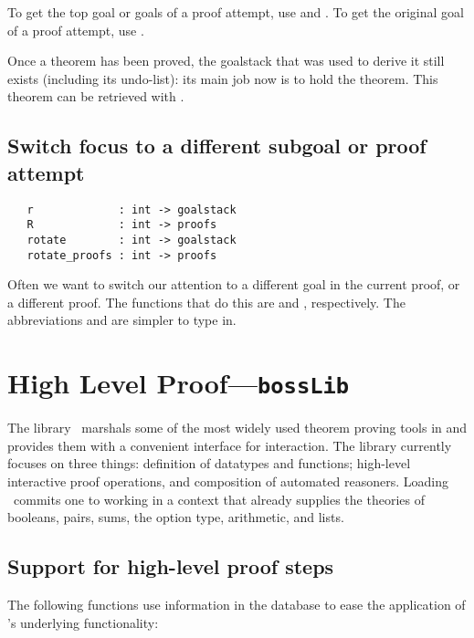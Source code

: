 To get the top goal or goals of a proof attempt, use 
and . To get the original goal of a proof attempt,
use .

Once a theorem has been proved, the goalstack that was used to derive it
still exists (including its undo-list): its main job now is to
hold the theorem. This theorem can be retrieved with
.

\subsection{Switch focus to a different subgoal or proof attempt}

\begin{hol}
\begin{verbatim}
   r             : int -> goalstack
   R             : int -> proofs
   rotate        : int -> goalstack
   rotate_proofs : int -> proofs
\end{verbatim}
\end{hol}

Often we want to switch our attention to a different goal in the current
proof, or a different proof. The functions that do this are
 and , respectively. The abbreviations
 and  are simpler to type in.

\section{High Level Proof---\texttt{bossLib}}
\label{sec:bossLib}
\newcommand\bossLib{\ml{bossLib}}

The library \bossLib\ marshals some of the most widely used theorem
proving tools in \HOL{} and provides them with a convenient interface
for interaction. The library currently focuses on three things:
definition of datatypes and functions; high-level interactive proof
operations, and composition of automated reasoners. Loading \bossLib\
commits one to working in a context that already supplies the theories
of booleans, pairs, sums, the option type, arithmetic, and lists.


\subsection{Support for high-level proof steps}
\label{sec:high-level-proof-steps}

The following functions use information in the database to ease the
application of \HOL's underlying functionality:

